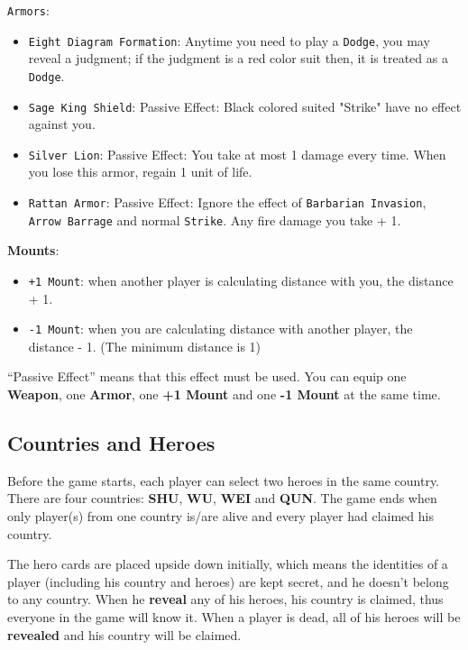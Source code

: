 \documentclass[11pt,a4paper]{article}
\begin{document}
\texttt{Armors}:
\begin{itemize}
\item \texttt{Eight Diagram Formation}: Anytime you need to play a \texttt{Dodge}, you may reveal a judgment; if the judgment is a red color suit then, it is treated as a \texttt{Dodge}.
\item \texttt{Sage King Shield}: Passive Effect: Black colored suited "Strike" have no effect against you.
\item \texttt{Silver Lion}: Passive Effect: You take at most 1 damage every time. When you lose this armor, regain 1 unit of life.
\item \texttt{Rattan Armor}: Passive Effect: Ignore the effect of \texttt{Barbarian Invasion}, \texttt{Arrow Barrage} and normal \texttt{Strike}. Any fire damage you take + 1.
\end{itemize}

\textbf{Mounts}:
\begin{itemize}
\item \texttt{+1 Mount}: when another player is calculating distance with you, the distance + 1.
\item \texttt{-1 Mount}: when you are calculating distance with another player, the distance - 1. (The minimum distance is 1)
\end{itemize}

``Passive Effect'' means that this effect must be used. You can equip one \textbf{Weapon}, one \textbf{Armor}, one \textbf{+1 Mount} and one \textbf{-1 Mount} at the same time.

\subsection{Countries and Heroes}

Before the game starts, each player can select two heroes in the same country. There are four countries: \textbf{SHU}, \textbf{WU}, \textbf{WEI} and \textbf{QUN}. The game ends when only player(s) from one country is/are alive and every player had claimed his country. \bigskip


The hero cards are placed upside down initially, which means the identities of a player (including his country and heroes) are kept secret, and he doesn't belong to any country. When he \textbf{reveal} any of his heroes, his country is claimed, thus everyone in the game will know it. When a player is dead, all of his heroes will be \textbf{revealed} and his country will be claimed. \bigskip
\end{document}
